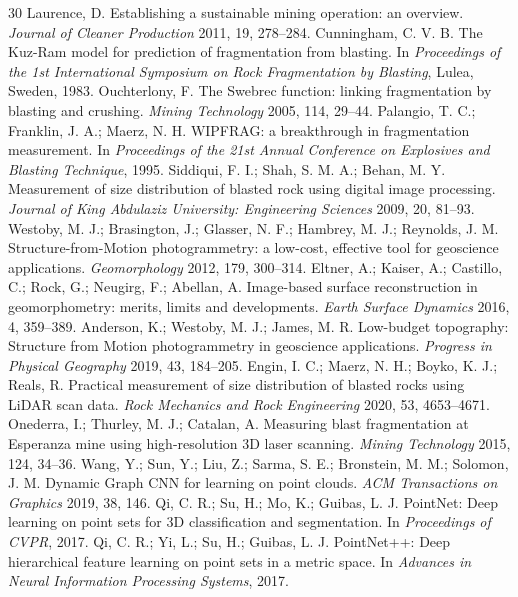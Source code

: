 \documentclass[11pt]{article}
\begin{document}
\begin{thebibliography}{30}
 Laurence, D. Establishing a sustainable mining operation: an overview. \emph{Journal of Cleaner Production} 2011, 19, 278--284.
 Cunningham, C. V. B. The Kuz-Ram model for prediction of fragmentation from blasting. In \emph{Proceedings of the 1st International Symposium on Rock Fragmentation by Blasting}, Lulea, Sweden, 1983.
 Ouchterlony, F. The Swebrec function: linking fragmentation by blasting and crushing. \emph{Mining Technology} 2005, 114, 29--44.
 Palangio, T. C.; Franklin, J. A.; Maerz, N. H. WIPFRAG: a breakthrough in fragmentation measurement. In \emph{Proceedings of the 21st Annual Conference on Explosives and Blasting Technique}, 1995.
 Siddiqui, F. I.; Shah, S. M. A.; Behan, M. Y. Measurement of size distribution of blasted rock using digital image processing. \emph{Journal of King Abdulaziz University: Engineering Sciences} 2009, 20, 81--93.
 Westoby, M. J.; Brasington, J.; Glasser, N. F.; Hambrey, M. J.; Reynolds, J. M. Structure-from-Motion photogrammetry: a low-cost, effective tool for geoscience applications. \emph{Geomorphology} 2012, 179, 300--314.
 Eltner, A.; Kaiser, A.; Castillo, C.; Rock, G.; Neugirg, F.; Abellan, A. Image-based surface reconstruction in geomorphometry: merits, limits and developments. \emph{Earth Surface Dynamics} 2016, 4, 359--389.
 Anderson, K.; Westoby, M. J.; James, M. R. Low-budget topography: Structure from Motion photogrammetry in geoscience applications. \emph{Progress in Physical Geography} 2019, 43, 184--205.
 Engin, I. C.; Maerz, N. H.; Boyko, K. J.; Reals, R. Practical measurement of size distribution of blasted rocks using LiDAR scan data. \emph{Rock Mechanics and Rock Engineering} 2020, 53, 4653--4671.
 Onederra, I.; Thurley, M. J.; Catalan, A. Measuring blast fragmentation at Esperanza mine using high-resolution 3D laser scanning. \emph{Mining Technology} 2015, 124, 34--36.
 Wang, Y.; Sun, Y.; Liu, Z.; Sarma, S. E.; Bronstein, M. M.; Solomon, J. M. Dynamic Graph CNN for learning on point clouds. \emph{ACM Transactions on Graphics} 2019, 38, 146.
 Qi, C. R.; Su, H.; Mo, K.; Guibas, L. J. PointNet: Deep learning on point sets for 3D classification and segmentation. In \emph{Proceedings of CVPR}, 2017.
 Qi, C. R.; Yi, L.; Su, H.; Guibas, L. J. PointNet++: Deep hierarchical feature learning on point sets in a metric space. In \emph{Advances in Neural Information Processing Systems}, 2017.

\end{thebibliography}
\end{document}
